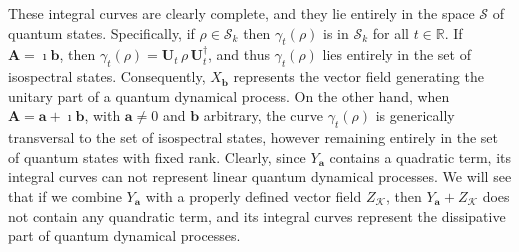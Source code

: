 \documentclass[11pt]{article}
\newcommand{\stsp}{\mathcal{S}}
\begin{document}
These integral curves are clearly complete,  and they lie entirely in the space $\stsp$ of quantum states.
Specifically, if $\rho\in\stsp_{k}$ then $\gamma_{t}(\rho)$ is in $\stsp_{k}$ for all $t\in\mathbb{R}$.
If $\mathbf{A}=\imath\mathbf{b}$, then $\gamma_{t}(\rho)=\mathbf{U}_{t}\,\rho\,\mathbf{U}_{t}^{\dagger}$, and thus $\gamma_{t}(\rho)$ lies entirely in the set of isospectral states.
Consequently, $X_{\mathbf{b}}$ represents the vector field generating the unitary part of a quantum dynamical process. 
On the other hand, when $\mathbf{A}=\mathbf{a} + \imath\mathbf{b}$, with $\mathbf{a}\neq0$ and $\mathbf{b}$ arbitrary, the curve $\gamma_{t}(\rho)$ is generically transversal to the set of isospectral states, however remaining entirely in the set of quantum states with fixed rank.
Clearly, since $Y_{\mathbf{a}}$ contains a quadratic term, its integral curves can not represent linear quantum dynamical processes.
We will see that if we combine $Y_{\mathbf{a}}$ with a properly defined vector field $Z_{\mathcal{K}}$, then $Y_{\mathbf{a}} + Z_{\mathcal{K}}$ does not contain any quandratic term, and its integral curves represent the dissipative part of quantum dynamical processes.
\end{document}
